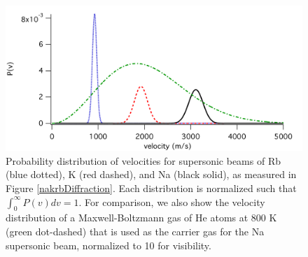 \begin{figure}
\centerline{\includegraphics[width=1.0\textwidth]{Figures/diffractionPofv2.pdf}}
\caption[Probability distribution of velocities in supersonic atom beams.]{\label{diffractionPofv} Probability distribution of velocities for supersonic beams of Rb (blue dotted), K (red dashed), and Na (black solid), as measured in Figure \ref{nakrbDiffraction}. Each distribution is normalized such that $\int_0^\infty P(v) dv =1$. For comparison, we also show the velocity distribution of a Maxwell-Boltzmann gas of He atoms at 800 K (green dot-dashed) that is used as the carrier gas for the Na supersonic beam, normalized to 10 for visibility.}
\end{figure}






